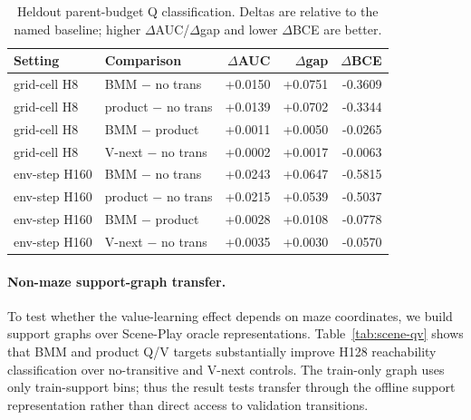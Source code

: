 \documentclass[11pt]{article}
\begin{document}
\begin{table}[t]
\centering
\caption{Heldout parent-budget Q classification. Deltas are relative to the named baseline; higher $\Delta$AUC/$\Delta$gap and lower $\Delta$BCE are better.}
\label{tab:budget-holdout}
\begin{tabular}{llrrr}
\toprule
Setting & Comparison & $\Delta$AUC & $\Delta$gap & $\Delta$BCE \\
\midrule
grid-cell H8 & BMM $-$ no trans & +0.0150 & +0.0751 & -0.3609 \\
grid-cell H8 & product $-$ no trans & +0.0139 & +0.0702 & -0.3344 \\
grid-cell H8 & BMM $-$ product & +0.0011 & +0.0050 & -0.0265 \\
grid-cell H8 & V-next $-$ no trans & +0.0002 & +0.0017 & -0.0063 \\
\midrule
env-step H160 & BMM $-$ no trans & +0.0243 & +0.0647 & -0.5815 \\
env-step H160 & product $-$ no trans & +0.0215 & +0.0539 & -0.5037 \\
env-step H160 & BMM $-$ product & +0.0028 & +0.0108 & -0.0778 \\
env-step H160 & V-next $-$ no trans & +0.0035 & +0.0030 & -0.0570 \\
\bottomrule
\end{tabular}
\end{table}

\paragraph{Non-maze support-graph transfer.}
To test whether the value-learning effect depends on maze coordinates, we build
support graphs over Scene-Play oracle representations. Table~\ref{tab:scene-qv}
shows that BMM and product Q/V targets substantially improve H128 reachability
classification over no-transitive and V-next controls. The train-only graph uses
only train-support bins; thus the result tests transfer through the offline
support representation rather than direct access to validation transitions.
\end{document}
